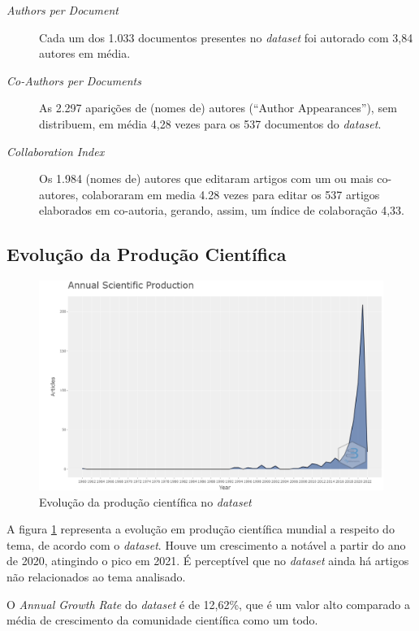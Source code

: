 \begin{description}
    \item [\textit{Authors per Document}] Cada um dos 1.033 documentos presentes no \textit{dataset} foi autorado com 3,84 autores em média.
    \item [\textit{Co-Authors per Documents}] As 2.297 aparições de (nomes de) autores (``Author Appearances''), sem distribuem, em média 4,28 vezes para os 537 documentos do \textit{dataset}.
    \item [\textit{Collaboration Index}] Os 1.984 (nomes de) autores que editaram artigos com um ou mais co-autores, colaboraram em media 4.28 vezes para editar os 537 artigos elaborados em co-autoria, gerando, assim, um índice de colaboração 4,33. 
\end{description}

\subsection{Evolução da Produção Científica}

\begin{figure}
    \centering
    \includegraphics[width=1\textwidth]{experiments/titofrota/PesquisaBibliometrica/Deepfakes/annual-plot.png}
    \caption{Evolução da produção científica no \textit{dataset}}
    \label{fig:evol:anual:DEEPFAKES@titofrota}
\end{figure}

A figura \ref{fig:evol:anual:DEEPFAKES@titofrota} representa a evolução em produção científica mundial a respeito do tema, de acordo com o \textit{dataset}. Houve um crescimento a notável a partir do ano de 2020, atingindo o pico em 2021. 
É perceptível que no \textit{dataset} ainda há artigos não relacionados ao tema analisado.

O \textit{Annual Growth Rate} do \textit{dataset} é de 12,62\%, que é um valor alto comparado a média de crescimento da comunidade científica como um todo.

